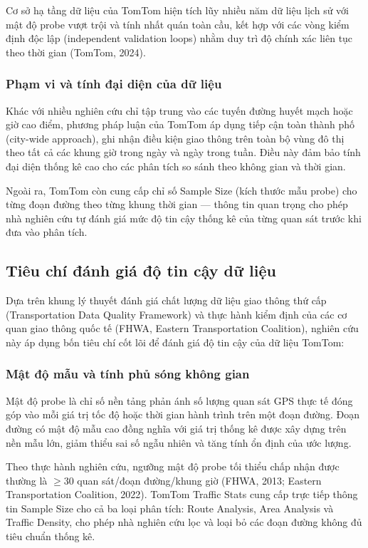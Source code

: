 Cơ sở hạ tầng dữ liệu của TomTom hiện tích lũy nhiều năm dữ liệu lịch sử với mật độ probe vượt trội và tính nhất quán toàn cầu, kết hợp với các vòng kiểm định độc lập (independent validation loops) nhằm duy trì độ chính xác liên tục theo thời gian (TomTom, 2024).

\subsubsection{Phạm vi và tính đại diện của dữ liệu}
Khác với nhiều nghiên cứu chỉ tập trung vào các tuyến đường huyết mạch hoặc giờ cao điểm, phương pháp luận của TomTom áp dụng tiếp cận toàn thành phố (city-wide approach), ghi nhận điều kiện giao thông trên toàn bộ vùng đô thị theo tất cả các khung giờ trong ngày và ngày trong tuần. Điều này đảm bảo tính đại diện thống kê cao cho các phân tích so sánh theo không gian và thời gian.

Ngoài ra, TomTom còn cung cấp chỉ số Sample Size (kích thước mẫu probe) cho từng đoạn đường theo từng khung thời gian --- thông tin quan trọng cho phép nhà nghiên cứu tự đánh giá mức độ tin cậy thống kê của từng quan sát trước khi đưa vào phân tích.

\subsection{Tiêu chí đánh giá độ tin cậy dữ liệu}
Dựa trên khung lý thuyết đánh giá chất lượng dữ liệu giao thông thứ cấp (Transportation Data Quality Framework) và thực hành kiểm định của các cơ quan giao thông quốc tế (FHWA, Eastern Transportation Coalition), nghiên cứu này áp dụng bốn tiêu chí cốt lõi để đánh giá độ tin cậy của dữ liệu TomTom:

\subsubsection{Mật độ mẫu và tính phủ sóng không gian}
Mật độ probe là chỉ số nền tảng phản ánh số lượng quan sát GPS thực tế đóng góp vào mỗi giá trị tốc độ hoặc thời gian hành trình trên một đoạn đường. Đoạn đường có mật độ mẫu cao đồng nghĩa với giá trị thống kê được xây dựng trên nền mẫu lớn, giảm thiểu sai số ngẫu nhiên và tăng tính ổn định của ước lượng.

Theo thực hành nghiên cứu, ngưỡng mật độ probe tối thiểu chấp nhận được thường là $\geq 30$ quan sát/đoạn đường/khung giờ (FHWA, 2013; Eastern Transportation Coalition, 2022). TomTom Traffic Stats cung cấp trực tiếp thông tin Sample Size cho cả ba loại phân tích: Route Analysis, Area Analysis và Traffic Density, cho phép nhà nghiên cứu lọc và loại bỏ các đoạn đường không đủ tiêu chuẩn thống kê.

